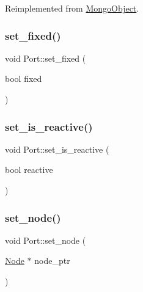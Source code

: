 Reimplemented from \hyperlink{class_mongo_object_a729412e226c9964e13ba80688c3f5e00}{Mongo\+Object}.

\mbox{\label{class_port_af913356cf60ebe37fb03d213db73b1bc}} 
\subsubsection{\texorpdfstring{set\+\_\+fixed()}{set\_fixed()}}
{\footnotesize\ttfamily void Port\+::set\+\_\+fixed (\begin{DoxyParamCaption}\item[{bool}]{fixed }\end{DoxyParamCaption})}

\mbox{\label{class_port_ae2808ef3b67c3dd01222aee10e35f6cd}} 
\subsubsection{\texorpdfstring{set\+\_\+is\+\_\+reactive()}{set\_is\_reactive()}}
{\footnotesize\ttfamily void Port\+::set\+\_\+is\+\_\+reactive (\begin{DoxyParamCaption}\item[{bool}]{reactive }\end{DoxyParamCaption})}

\mbox{\label{class_port_a5dfef60c4b30386e97d2829a23a0d3d3}} 
\subsubsection{\texorpdfstring{set\+\_\+node()}{set\_node()}}
{\footnotesize\ttfamily void Port\+::set\+\_\+node (\begin{DoxyParamCaption}\item[{\hyperlink{class_node}{Node} $\ast$}]{node\+\_\+ptr }\end{DoxyParamCaption})\hspace{0.3cm}{\ttfamily [inline]}}

\mbox{\label{class_port_ab35e1343f0db5a0b258d9541958324bc}} 
